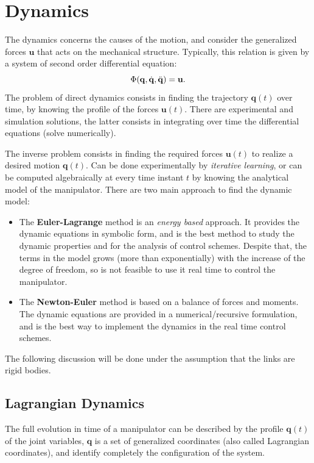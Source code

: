 \documentclass[10pt, a4paper]{report}
\newcommand{\q}{{\mathbf q}}
\begin{document}
\chapter{Dynamics}
The dynamics concerns the causes of the motion, and consider the generalized forces $\mathbf u$ that acts on the mechanical structure. Typically, this relation is given by a system of second order differential equation:\begin{equation}
    \Phi(\q,\dq,\ddq)=\mathbf u.
\end{equation}
The problem of direct dynamics consists in finding the trajectory $\q(t)$ over time, by knowing the profile of the forces $\mathbf u(t)$. There are experimental and simulation solutions, the latter consists in integrating over time the differential equations (solve numerically).

The inverse problem consists in finding the required forces $\mathbf u(t)$ to realize a desired motion $\q(t)$. Can be done experimentally by \textit{iterative learning}, or can be computed algebraically at every time instant $t$ by knowing the analytical model of the manipulator. There are two main approach to find the dynamic model:\begin{itemize}
    \item The \textbf{Euler-Lagrange} method is an \textit{energy based} approach. It provides the dynamic equations in symbolic form, and is the best method to study the dynamic properties and for the analysis of control schemes. Despite that, the terms in the model grows (more than exponentially) with the increase of the degree of freedom, so is not feasible to use it real time to control the manipulator. 
    \item The \textbf{Newton-Euler} method is based on a balance of forces and moments. The dynamic equations are provided in a numerical/recursive formulation, and is the best way to implement the dynamics in the real time control schemes. 
\end{itemize}
The following discussion will be done under the assumption that the links are rigid bodies.
\section{Lagrangian Dynamics}

The full evolution in time of a manipulator can be described by the profile $\q(t)$ of the joint variables, $\q$ is a set of generalized coordinates (also called Lagrangian coordinates), and identify completely the configuration of the system. 
\end{document}
